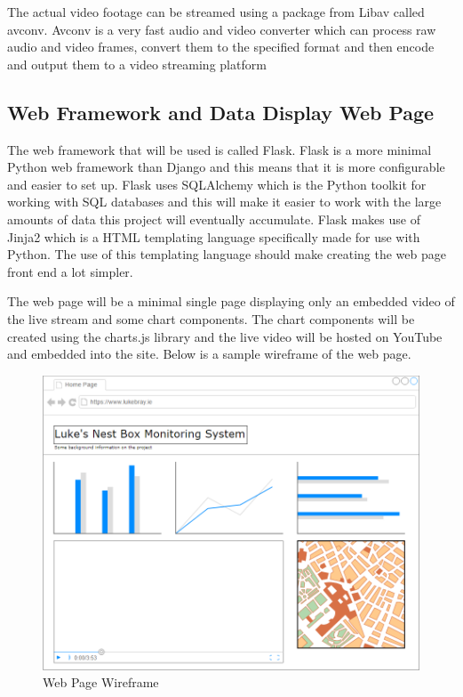 \documentclass[10pt,a4paper]{article}
\begin{document}
The actual video footage can be streamed using a package from Libav called avconv. Avconv is a very fast audio and video converter which can process raw audio and video frames, convert them to the specified format and then encode and output them to a video streaming platform\citep{avconv}

\subsection{Web Framework and Data Display Web Page}
The web framework that will be used is called Flask. Flask is a more minimal Python web framework than Django and this means that it is more configurable and easier to set up. Flask uses SQLAlchemy which is the Python toolkit for working with SQL databases and this will make it easier to work with the large amounts of data this project will eventually accumulate. Flask makes use of Jinja2 which is a HTML templating language specifically made for use with Python. The use of this templating language should make creating the web page front end a lot simpler.

The web page will be a minimal single page displaying only an embedded video of the live stream and some chart components. The chart components will be created using the charts.js library and the live video will be hosted on YouTube and embedded into the site. Below is a sample wireframe of the web page. 

\begin{figure}[H]
\centering
  \includegraphics[width=\linewidth]{images/web_page_mock_up.png}
  \caption{Web Page Wireframe}
  \label{fig:webwireframe}
\end{figure}
\end{document}
